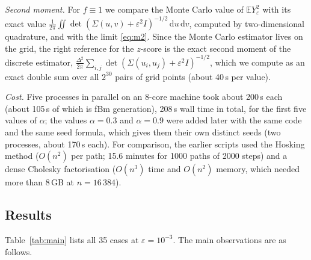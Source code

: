 \documentclass[11pt]{article}
\theoremstyle{remark}
\theoremstyle{definition}
\newcommand{\E}{\mathbb{E}}
\newcommand{\dd}{\,\mathrm{d}}
\begin{document}
\emph{Second moment.} For $f\equiv1$ we compare the Monte Carlo value of $\E Y_\varepsilon^2$ with its exact value $\frac{1}{2\pi}\iint\det(\Sigma(u,v)+\varepsilon^2 I)^{-1/2}\dd u\dd v$, computed by two-dimensional quadrature, and with the limit \eqref{eq:m2}. Since the Monte Carlo estimator lives on the grid, the right reference for the $z$-score is the exact second moment of the discrete estimator, $\frac{\Delta^2}{2\pi}\sum_{i,j}\det(\Sigma(u_i,u_j)+\varepsilon^2I)^{-1/2}$, which we compute as an exact double sum over all $2^{30}$ pairs of grid points (about 40\,s per value).

\emph{Cost.} Five processes in parallel on an 8-core machine took about 200\,s each (about 105\,s of which is fBm generation), 208\,s wall time in total, for the first five values of $\alpha$; the values $\alpha=0.3$ and $\alpha=0.9$ were added later with the same code and the same seed formula, which gives them their own distinct seeds (two processes, about 170\,s each). For comparison, the earlier scripts used the Hosking method ($O(n^2)$ per path; 15.6 minutes for 1000 paths of 2000 steps) and a dense Cholesky factorisation ($O(n^3)$ time and $O(n^2)$ memory, which needed more than 8\,GB at $n=16\,384$).

\subsection{Results}\label{sec:results}
Table~\ref{tab:main} lists all 35 cases at $\varepsilon=10^{-3}$. The main observations are as follows.
\end{document}
